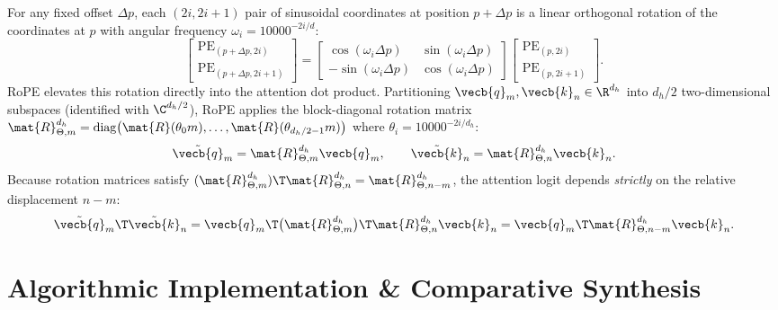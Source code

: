 \documentclass[../../../../master.tex]{subfiles}
\begin{document}
\begin{coremath}
For any fixed offset $\Delta p$, each $(2i, 2i+1)$ pair of sinusoidal coordinates at position $p + \Delta p$ is a linear orthogonal rotation of the coordinates at $p$ with angular frequency $\omega_i = 10000^{-2i/d}$:
\begin{equation}
  \begin{bmatrix} \mathrm{PE}_{(p+\Delta p, 2i)} \\ \mathrm{PE}_{(p+\Delta p, 2i+1)} \end{bmatrix}
  = \begin{bmatrix} \cos(\omega_i \Delta p) & \sin(\omega_i \Delta p) \\ -\sin(\omega_i \Delta p) & \cos(\omega_i \Delta p) \end{bmatrix}
  \begin{bmatrix} \mathrm{PE}_{(p, 2i)} \\ \mathrm{PE}_{(p, 2i+1)} \end{bmatrix}.
  \label{eq:tok:sinusoid_shift}
\end{equation}
RoPE elevates this rotation directly into the attention dot product. Partitioning $\vecb{q}_m, \vecb{k}_n \in \R^{d_h}$ into $d_h/2$ two-dimensional subspaces (identified with $\C^{d_h/2}$), RoPE applies the block-diagonal rotation matrix $\mat{R}_{\Theta, m}^{d_h} = \mathrm{diag}\bigl(\mat{R}(\theta_0 m), \dots, \mat{R}(\theta_{d_h/2-1} m)\bigr)$ where $\theta_i = 10000^{-2i/d_h}$:
\begin{equation}
  \tilde{\vecb{q}}_m = \mat{R}_{\Theta, m}^{d_h} \vecb{q}_m, \qquad
  \tilde{\vecb{k}}_n = \mat{R}_{\Theta, n}^{d_h} \vecb{k}_n.
\end{equation}
Because rotation matrices satisfy $(\mat{R}_{\Theta, m}^{d_h})\T \mat{R}_{\Theta, n}^{d_h} = \mat{R}_{\Theta, n-m}^{d_h}$, the attention logit depends \emph{strictly} on the relative displacement $n - m$:
\begin{equation}
  \tilde{\vecb{q}}_m\T \tilde{\vecb{k}}_n = \vecb{q}_m\T \bigl(\mat{R}_{\Theta, m}^{d_h}\bigr)\T \mat{R}_{\Theta, n}^{d_h} \vecb{k}_n = \vecb{q}_m\T \mat{R}_{\Theta, n-m}^{d_h} \vecb{k}_n.
  \label{eq:tok:rope_rel}
\end{equation}
\end{coremath}

\section{Algorithmic Implementation \& Comparative Synthesis}
\label{sec:tok:algorithms}
\end{document}
